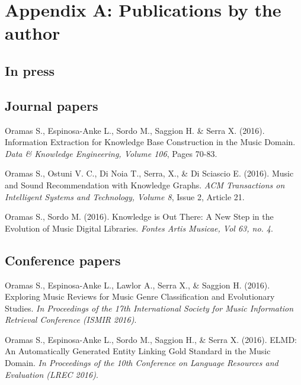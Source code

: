 
\chapter{Appendix A: Publications by the author}
\label{sec:Pubs}


\section*{In press}


\section*{Journal papers}


Oramas S., Espinosa-Anke L., Sordo M., Saggion H. \& Serra X. (2016). Information Extraction for Knowledge Base Construction in the Music Domain. \emph{Data \& Knowledge Engineering, Volume 106}, Pages 70-83.

\vspace{0.2cm}

Oramas S., Ostuni V. C., Di Noia T., Serra, X., \& Di Sciascio E. (2016). Music and Sound Recommendation with Knowledge Graphs. \emph{ACM Transactions on Intelligent Systems and Technology, Volume 8}, Issue 2, Article 21.

\vspace{0.2cm}

Oramas S., Sordo M. (2016). Knowledge is Out There: A New Step in the Evolution of Music Digital Libraries. \emph{Fontes Artis Musicae, Vol 63, no. 4}.


\section*{Conference papers}

Oramas S., Espinosa-Anke L., Lawlor A., Serra X., \& Saggion H. (2016). Exploring Music Reviews for Music Genre Classification and Evolutionary Studies. \emph{In Proceedings of the 17th International Society for Music Information Retrieval Conference (ISMIR 2016)}.

\vspace{0.2cm}

Oramas S., Espinosa-Anke L., Sordo M., Saggion H., \& Serra X. (2016). ELMD: An Automatically Generated Entity Linking Gold Standard in the Music Domain. \emph{In Proceedings of the 10th Conference on Language Resources and Evaluation (LREC 2016)}.

